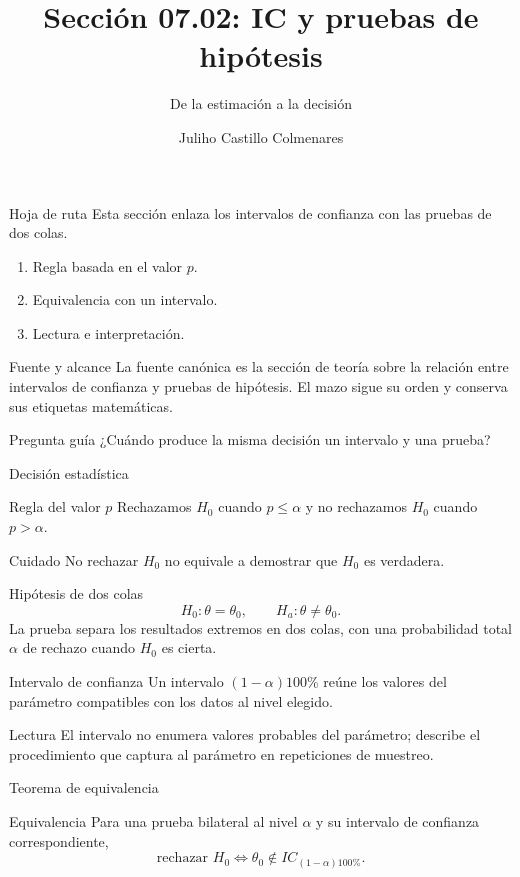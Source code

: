 \documentclass[10pt,aspectratio=169]{beamer}
\title[IC y pruebas de hipótesis]{Sección 07.02: IC y pruebas de hipótesis}
\subtitle{De la estimación a la decisión}
\author[J. Castillo Colmenares]{Juliho Castillo Colmenares}
\institute{Tecnológico de Monterrey}
\date{}
\begin{document}
\begin{frame}[plain]\titlepage\end{frame}
\begin{frame}{Hoja de ruta}
\small Esta sección enlaza los intervalos de confianza con las pruebas de dos colas.
\begin{enumerate}\item Regla basada en el valor $p$.\item Equivalencia con un intervalo.\item Lectura e interpretación.\end{enumerate}
\end{frame}
\begin{frame}{Fuente y alcance}
\small La fuente canónica es la sección de teoría sobre la relación entre intervalos de confianza y pruebas de hipótesis. El mazo sigue su orden y conserva sus etiquetas matemáticas.
\begin{block}{Pregunta guía} ¿Cuándo produce la misma decisión un intervalo y una prueba?\end{block}
\end{frame}
\begin{frame}{Decisión estadística}\small
\begin{block}{Regla del valor $p$} Rechazamos $H_0$ cuando $p\leq\alpha$ y no rechazamos $H_0$ cuando $p>\alpha$.\end{block}
\begin{alertblock}{Cuidado} No rechazar $H_0$ no equivale a demostrar que $H_0$ es verdadera.\end{alertblock}
\end{frame}
\begin{frame}{Hipótesis de dos colas}\small
\[H_0:\theta=\theta_0,\qquad H_a:\theta\neq\theta_0.\]
La prueba separa los resultados extremos en dos colas, con una probabilidad total $\alpha$ de rechazo cuando $H_0$ es cierta.
\end{frame}
\begin{frame}{Intervalo de confianza}\small
Un intervalo $(1-\alpha)100\%$ reúne los valores del parámetro compatibles con los datos al nivel elegido.
\begin{block}{Lectura} El intervalo no enumera valores probables del parámetro; describe el procedimiento que captura al parámetro en repeticiones de muestreo.\end{block}
\end{frame}
\begin{frame}{Teorema de equivalencia}\small
\begin{block}{Equivalencia}
Para una prueba bilateral al nivel $\alpha$ y su intervalo de confianza correspondiente,
\[\text{rechazar }H_0\Longleftrightarrow \theta_0\notin IC_{(1-\alpha)100\%}.\]
\end{block}
\end{frame}
\end{document}
